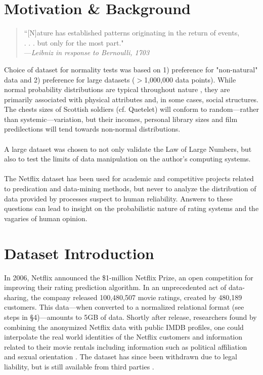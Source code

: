 \documentclass{acmtog}
\begin{document}
\section{Motivation \& Background}
\medskip
\begin{quote}
``[N]ature has established patterns originating in the return of events,\\
 . . . but only for the most part."\\

\hspace{5em}---\textit{Leibniz in response to Bernoulli, 1703}
\end{quote}
Choice of dataset for normality tests was based on 1) preference for "non-natural" data and 2) preference for large datasets ($>$1,000,000 data points). While normal probability distributions are typical throughout nature \cite{bernstein:against}, they are primarily associated with physical attributes and, in some cases, social structures. The chests sizes of Scottish soldiers (cf. Quetelet) will conform to random---rather than systemic---variation, but their incomes, personal library sizes and film predilections will tend towards non-normal distributions.
\\
\\
A large dataset was chosen to not only validate the Law of Large Numbers, but also to test the limits of data manipulation on the author's computing systems.
\\
\\
The Netflix dataset has been used for academic and competitive projects related to predication and data-mining methods, but never to analyze the distribution of data provided by processes suspect to human reliability. Answers to these questions can lead to insight on the probabilistic nature of rating systems and the vagaries of human opinion.

\section{Dataset Introduction}

In 2006, Netflix announced the \$1-million Netflix Prize, an open competition for improving their rating prediction algorithm. In an unprecedented act of data-sharing, the company released 100,480,507 movie ratings, created by 480,189 customers. This data---when converted to a normalized relational format (see steps in \S4)---amounts to 5GB of data. Shortly after release, researchers found by combining the anonymized Netflix data with public IMDB profiles, one could interpolate the real world identities of the Netflix customers and information related to their movie rentals \cite{DBLP:journals/corr/abs-cs-0610105} including information such as political affiliation and sexual orientation \cite{Wired-01}. The dataset has since been withdrawn due to legal liability, but is still available from third parties \cite{netflix-01}.
\end{document}
